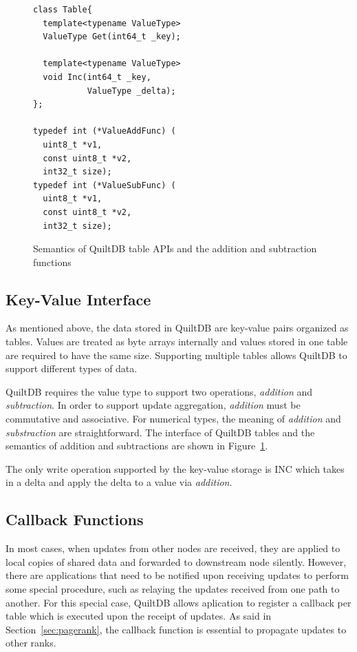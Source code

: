 \documentclass[11pt, twocolumn]{article}
\begin{document}
\begin{figure}[th!]

\begin{lstlisting}
class Table{
  template<typename ValueType>
  ValueType Get(int64_t _key);

  template<typename ValueType>
  void Inc(int64_t _key,
           ValueType _delta);
};

typedef int (*ValueAddFunc) (
  uint8_t *v1,
  const uint8_t *v2,
  int32_t size);
typedef int (*ValueSubFunc) (
  uint8_t *v1,
  const uint8_t *v2,
  int32_t size);
\end{lstlisting}

\caption{Semantics of QuiltDB table APIs and the addition and subtraction
  functions}
\label{fig:table-api}
\end{figure}

\subsection{Key-Value Interface}

As mentioned above, the data stored in QuiltDB are key-value pairs organized
as tables. Values are treated as byte arrays internally and values stored in one
table are required to have the same size. Supporting multiple tables allows
QuiltDB to support different types of data.

QuiltDB requires the value type to support two operations, \emph{addition} and
\emph{subtraction}. In order to support update aggregation, \emph{addition} must
 be commutative and associative. For numerical types,  the meaning of
\emph{addition} and \emph{substraction} are straightforward. The interface of
QuiltDB tables and the semantics of addition and subtractions are shown in
Figure~\ref{fig:table-api}.

The only write operation supported by the key-value storage is INC which takes
in a delta and apply the delta to a value via \emph{addition}.

\subsection{Callback Functions}
\label{sec:callback}

In most cases, when updates from other nodes are received, they are applied to
local copies of shared data and forwarded to downstream node silently.
However, there are applications that need to be notified upon receiving updates
to perform some special procedure, such as relaying the updates received from
one path to another. For this special case, QuiltDB allows aplication to
register a callback per table which is executed upon the receipt of updates. As
said in Section~\ref{sec:pagerank}, the callback function is essential to
propagate updates to other ranks.
\end{document}
